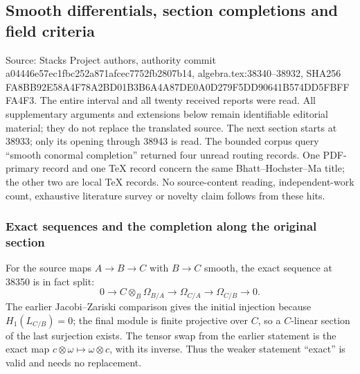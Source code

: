 \subsection{Smooth differentials, section completions and field criteria}\label{algebra-proof-049-smooth-differentials-section-completions-and-field-criteria}

Source: Stacks Project authors, authority commit a044\allowbreak{}46e5\allowbreak{}7ec1\allowbreak{}fbc2\allowbreak{}52a8\allowbreak{}71af\allowbreak{}cec7\allowbreak{}752f\allowbreak{}b280\allowbreak{}7b14, algebra.\AlgebraIdentifierBreak{}tex:\AlgebraIdentifierBreak{}38340--\AlgebraIdentifierBreak{}38932, SHA256 FA8B\allowbreak{}B92E\allowbreak{}58A4\allowbreak{}F78A\allowbreak{}2BD0\allowbreak{}1B3B\allowbreak{}6A4A\allowbreak{}87DE\allowbreak{}0A0D\allowbreak{}279F\allowbreak{}5DD9\allowbreak{}0641\allowbreak{}B574\allowbreak{}DD5F\allowbreak{}BFFF\allowbreak{}A4F3. The entire interval and all twenty received reports were read. All supplementary arguments and extensions below remain identifiable editorial material; they do not replace the translated source. The next section starts at 38933; only its opening through 38943 is read. The bounded corpus query ``smooth conormal completion'' returned four unread routing records. One PDF-primary record and one TeX record concern the same Bhatt--Hochster--Ma title; the other two are local TeX records. No source-content reading, independent-work count, exhaustive literature survey or novelty claim follows from these hits.

\subsubsection{Exact sequences and the completion along the original section}\label{algebra-proof-049-exact-sequences-and-the-completion-along-the-original-section}

For the source maps \(A\to B\to C\) with \(B\to C\) smooth, the exact sequence at 38350 is in fact split: \[
0\longrightarrow C\otimes_B\Omega_{B/A}\longrightarrow
\Omega_{C/A}\longrightarrow\Omega_{C/B}\longrightarrow0.
\] The earlier Jacobi--Zariski comparison gives the initial injection because \(H_1(L_{C/B})=0\); the final module is finite projective over \(C\), so a \(C\)-linear section of the last surjection exists. The tensor swap from the earlier statement is the exact map \(c\otimes\omega\mapsto\omega\otimes c\), with its inverse. Thus the weaker statement ``exact'' is valid and needs no replacement.

